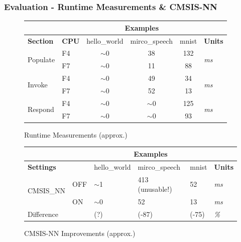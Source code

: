 \documentclass{tum-presentation}
\begin{document}
\begin{frame}
  \frametitle{Evaluation - Runtime Measurements \& CMSIS-NN}

\begin{figure}[h]
     \centering
\begin{table}[h!]
\begin{tabular}{|l|l|c|c|c|l|}
\hline
& &\multicolumn{3}{c|}{\textbf{Examples}} &\\\hline
\textbf{Section} & \textbf{CPU} & hello\_world  & mirco\_speech & mnist                                         & \textbf{Units} \\\hline
\multirow{2}{*}{Populate}     &  F4              & $\sim$0 & 38 & 132 & \multirow{2}{*}{\textit{ms}} \\
&F7&$\sim$0&11&88&\\\hline
\multirow{2}{*}{Invoke}     &  F4              & $\sim$0 & 49 & 34 & \multirow{2}{*}{\textit{ms}} \\
&F7&$\sim$0&52&13&\\\hline
\multirow{2}{*}{Respond}     &  F4              & $\sim$0 & $\sim$0 & 125 & \multirow{2}{*}{\textit{ms}} \\
&F7&$\sim$0&$\sim$0&93&\\\hline
\end{tabular}
\end{table}
 \caption{Runtime Measurements (approx.)}
\end{figure}

\begin{figure}[h]
     \centering
\begin{table}[h]
\begin{tabular}{|l|l|l|l|l|l|}
\hline
\multicolumn{2}{|l|}{} & \multicolumn{3}{c|}{\textbf{Examples}} &\\\hline
\multicolumn{2}{|l|}{\textbf{Settings}}  & hello\_world & mirco\_speech & mnist & \textbf{Units} \\\hline
\multirow{2}{*}{CMSIS\_NN} & OFF              & $\sim$1                 & 413 (unusable!)                 & 52               & \textit{ms}             \\
 & ON               & $\sim$0                 & 52                       & 13               & \textit{ms}              \\\hline
\multicolumn{2}{|l|}{Difference}                   & (?)                     & (-87)                    & (-75)            & \textit{\%}           \\\hline  
\end{tabular}
\end{table}
 \caption{CMSIS-NN Improvements (approx.)}
\end{figure}

\end{frame}
\end{document}

